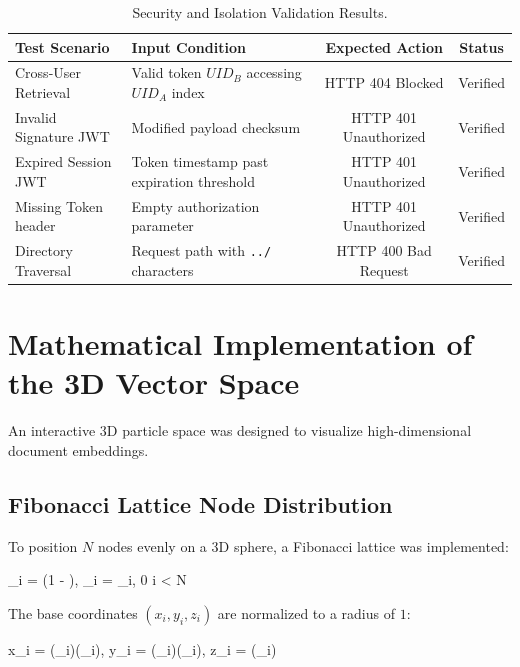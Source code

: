 \documentclass[11pt,journal,onecolumn]{article}
\begin{document}
\begin{table}[htbp]
\centering
\begin{tabular}{@{}llcc@{}}
\toprule
\textbf{Test Scenario} & \textbf{Input Condition} & \textbf{Expected Action} & \textbf{Status} \\ \midrule
Cross-User Retrieval & Valid token $UID_B$ accessing $UID_A$ index & HTTP 404 Blocked & Verified \\
Invalid Signature JWT & Modified payload checksum & HTTP 401 Unauthorized & Verified \\
Expired Session JWT & Token timestamp past expiration threshold & HTTP 401 Unauthorized & Verified \\
Missing Token header & Empty authorization parameter & HTTP 401 Unauthorized & Verified \\
Directory Traversal & Request path with \texttt{../} characters & HTTP 400 Bad Request & Verified \\ \bottomrule
\end{tabular}
\caption{Security and Isolation Validation Results.}
\label{tab:security}
\end{table}

\section{Mathematical Implementation of the 3D Vector Space}
An interactive 3D particle space was designed to visualize high-dimensional document embeddings.

\subsection{Fibonacci Lattice Node Distribution}
To position $N$ nodes evenly on a 3D sphere, a Fibonacci lattice was implemented:
\begin{equation{}}
    \phi_i = \arccos\left(1 - \right), \quad \theta_i =  \cdot \phi_i, \quad {} 0 \le i < N
\end{equation{}}
The base coordinates $(x_i, y_i, z_i)$ are normalized to a radius of $1$:
\begin{equation{}}
    x_i = \sin(\phi_i)\cos(\theta_i), \quad y_i = \sin(\phi_i)\sin(\theta_i), \quad z_i = \cos(\phi_i)
\end{equation{}}
\end{document}
